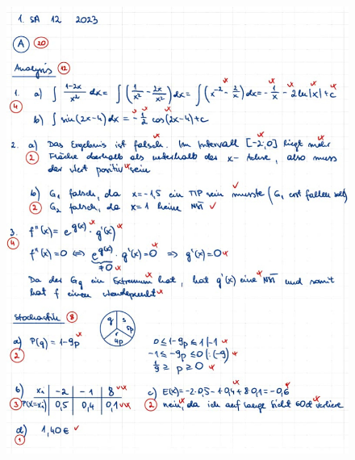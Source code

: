 \documentclass[a4paper,12pt]{article}
\begin{document}
\newpage
  \begin{figure}[H]
    \vspace{0cm}
    \centering
    \includegraphics[width=1.2\linewidth]{Q12_SA_240103_8.jpg}
  \end{figure}
\end{document}
